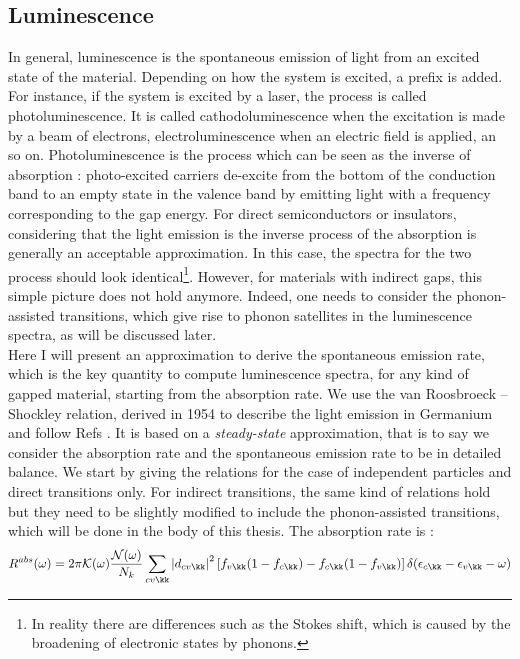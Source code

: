 \subsection{Luminescence}
In general, luminescence is the spontaneous emission of light from an excited state of the material. Depending on how the system is excited, a prefix is added. For instance, if the system is excited by a laser, the process is called photoluminescence. It is called cathodoluminescence when the excitation is made by a beam of electrons, electroluminescence when an electric field is applied, an so on.
Photoluminescence is the process which can be seen as the inverse of absorption : photo-excited carriers de-excite from the bottom of the conduction band to an empty state in the valence band by emitting light with a frequency corresponding to the gap energy. For direct semiconductors or insulators, considering that the light emission is the inverse process of the absorption is generally an acceptable approximation. In this case, the spectra for the two process should look identical\footnote[1]{In reality there are differences such as the Stokes shift, which is caused by the broadening of electronic states by phonons.}. However, for materials with indirect gaps, this simple picture does not hold anymore. Indeed, one needs to consider the phonon-assisted transitions, which give rise to phonon satellites in the luminescence spectra, as will be discussed later. \\
Here I will present an approximation to derive the spontaneous emission rate, which is the key quantity to compute luminescence spectra, for any kind of gapped material, starting from the absorption rate. We use the van Roosbroeck -- Shockley relation, derived in 1954 to describe the light emission in Germanium \cite{van1954photon} and follow Refs \cite{paleari2019exciton,paleari2019first,}. It is based on a \emph{steady-state} approximation, that is to say we consider the absorption rate and the spontaneous emission rate to be in detailed balance. We start by giving the relations for the case of independent particles and direct transitions only. For indirect transitions, the same kind of relations hold but they need to be slightly modified to include the phonon-assisted transitions, which will be done in the body of this thesis. The absorption rate is :
\begin{equation}
	R^{abs}(\omega) = 2\pi \mathcal{K}(\omega) \frac{\mathcal{N} (\omega)}{N_k} \sum_{cv\kk} \left|d_{cv\kk} \right|^2 \left[ f_{v\kk}(1-f_{c\kk}) - f_{c\kk}(1-f_{v\kk})\right] \delta(\epsilon_{c\kk} - \epsilon_{v\kk} - \omega)
\end{equation}
